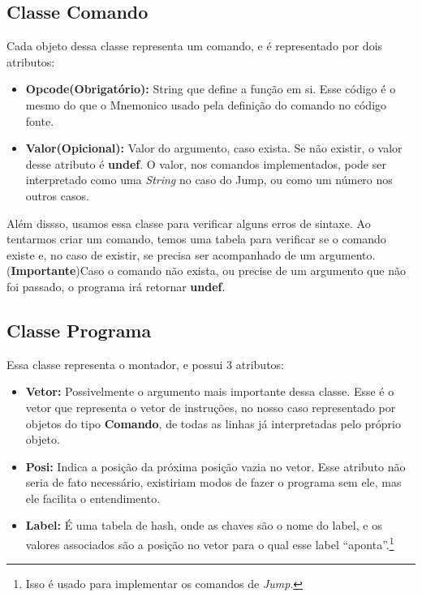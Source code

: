 \documentclass[11pt]{article}
\begin{document}
\subsection{Classe Comando}

Cada objeto dessa classe representa um comando, e é representado por dois atributos:

\begin{itemize}

\item \textbf{Opcode({\color{red}Obrigatório}):} String que define a função em si. Esse código é o mesmo do que o Mnemonico usado pela definição do comando no código fonte.

\item \textbf{Valor({\color{red}Opicional}):} Valor do argumento, caso exista. Se não existir, o valor desse atributo é \textbf{\color{blue}undef}. O valor, nos comandos implementados, pode ser interpretado como uma \emph{String} no caso do Jump, ou como um número nos outros casos.

\end{itemize}

Além dissso, usamos essa classe para verificar alguns erros de sintaxe. Ao tentarmos criar um comando, temos uma tabela para verificar se o comando existe e, no caso de existir, se precisa ser acompanhado de um argumento.(\textbf{\color{red}Importante})Caso o comando não exista, ou precise de um argumento que não foi passado, o programa irá retornar \textbf{\color{blue}undef}.

\subsection{Classe Programa}

Essa classe representa o montador, e possui 3 atributos:

\begin{itemize}

\item \textbf{Vetor:} Possivelmente o argumento mais importante dessa classe. Esse é o vetor que representa o vetor de instruções, no nosso caso representado por objetos do tipo \textbf{\color{red}Comando}, de todas as linhas já interpretadas pelo próprio objeto.

\item \textbf{Posi:} Indica a posição da próxima posição vazia no vetor. Esse atributo não seria de fato necessário, existiriam modos de fazer o programa sem ele, mas ele facilita o entendimento.

\item \textbf{Label:} É uma tabela de hash, onde as {\color{red}chaves} são o nome do label, e os {\color{red}valores associados} são a posição no vetor para o qual esse label ``aponta''.\footnote{Isso é usado para implementar os comandos de \emph{Jump}.}

\end{itemize}
\end{document}
